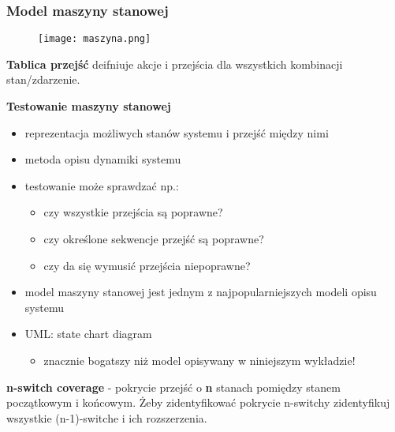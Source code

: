 \documentclass[../main.tex]{subfiles}
\begin{document}
    \subsubsection{Model maszyny stanowej}

    \begin{figure}[H]
        \texttt{[image: maszyna.png]}
    \end{figure}

    \textbf{Tablica przejść} deifniuje akcje i przejścia dla wszystkich kombinacji stan/zdarzenie.

    \textbf{Testowanie maszyny stanowej}
    \begin{itemize}
        \item reprezentacja możliwych stanów systemu i przejść między nimi
        \item metoda opisu dynamiki systemu
        \item testowanie może sprawdzać np.:
        \begin{itemize}
            \item czy wszystkie przejścia są poprawne?
            \item czy określone sekwencje przejść są poprawne?
            \item czy da się wymusić przejścia niepoprawne?
        \end{itemize}
        \item model maszyny stanowej jest jednym z najpopularniejszych modeli
        opisu systemu
        \item UML: state chart diagram
        \begin{itemize}
            \item znacznie bogatszy niż model opisywany w niniejszym wykładzie!
        \end{itemize}
    \end{itemize}

    \textbf{n-switch coverage} - pokrycie przejść o \textbf{n} stanach pomiędzy stanem początkowym i końcowym.
    Żeby zidentyfikować pokrycie n-switchy zidentyfikuj wszystkie (n-1)-switche i ich rozszerzenia.
\end{document}
